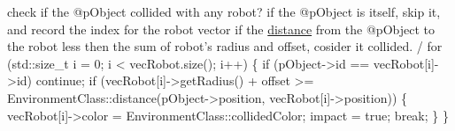 \begin{DoxyCode}
   check \textcolor{keywordflow}{if} the @pObject collided with any robot?
   \textcolor{keywordflow}{if} the @pObject is itself, skip it, and record the index \textcolor{keywordflow}{for} the robot vector
   \textcolor{keywordflow}{if} the \hyperlink{classEnvironmentClass_a3fa1b87f8ae74bf1cefda9862e1bdfca}{distance} from the @pObject to the robot less then the sum of robot\textcolor{stringliteral}{'s radius and offset,}
\textcolor{stringliteral}{   cosider it collided.}
\textcolor{stringliteral}{  / }
\textcolor{stringliteral}{for (std::size\_t i = 0; i < vecRobot.size(); i++)}
\textcolor{stringliteral}{\{}
\textcolor{stringliteral}{    if (pObject->id == vecRobot[i]->id)}
\textcolor{stringliteral}{        continue;}
\textcolor{stringliteral}{    }
\textcolor{stringliteral}{    if (vecRobot[i]->getRadius() + offset >= EnvironmentClass::distance(pObject->position,
       vecRobot[i]->position))}
\textcolor{stringliteral}{    \{}
\textcolor{stringliteral}{        vecRobot[i]->color = EnvironmentClass::collidedColor;}
\textcolor{stringliteral}{        impact = true;}
\textcolor{stringliteral}{        }
\textcolor{stringliteral}{        break;}
\textcolor{stringliteral}{    \}}
\textcolor{stringliteral}{\}}
\end{DoxyCode}



